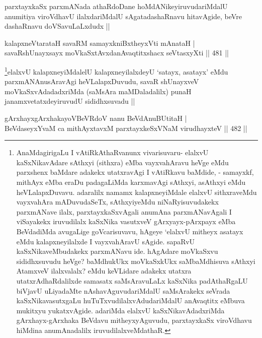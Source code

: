 \begin{artha}
parxtayxkaSx parxmANada athaRdoDane hoMdANikeyiruvudariMdalU anumitiya viroVdhavU ilalxdariMdalU sAgatadashaRnavu hitavAgide, beVre dashaRnavu doVSavuLaLxdudx ||
\end{artha}


\begin{shl}
kalapxneVtarataH savaRM samayxkniBxtheyxVti mAnataH | \\
savaRshUnayxsayx moVkaSxtAvxdanAvaqtitxshacx seVtasxyXti \hfill||  481 ||  
\end{shl}

\begin{artha}
\footnote{AnaMdagirigaLu I vAtiRkAthaRvanunx vivarisuvaru- elalxvU kaSxNikavAdare sAthxyi (sithxra) eMba vayxvahAravu heVge eMdu parxshenx baMdare adakekx utatxravAgi I vAtiRkavu baMdide, - samayxkf, mithAyx eMba eraDu padagaLiMda karxmavAgi sAthxyi, asAthxyi eMdu heVLalapxDuvavu. adaralilx namamx kalapxneyiMdale elalxvU sithxraveMdu vayxvahAra mADuvudaSeTx, sAthxyiyeMdu niNaRyisuvudakekx parxmANave ilalx, parxtayxkaSxvAgali anumAna parxmANavAgali I viSayakekx iruvudilalx kaSxNika vasutxveV gArxyayx-pArxpayx eMba BeVdadiMda avugaLige goVcarisuvavu, hAgeye `elalxvU mitheyx asatayx eMdu kalapxneyilalxde I vayxvahAravU sAgide. sapaRvU kaSxNikaveMbudakekx parxmANavu ide. hAgAdare moVkaSxvu sididhxsuvudu heVge? baMdhukUkx moVkaSxkUkx saMbaMdhisuva sAthxyi AtamxveV ilalxvalalx? eMdu keVLidare adakekx utatxra utatxrAdhaRdalilxde samasatx saMsAravuLaLx kaSxNika padAthaRgaLU biVjavU uLiyadaMte nAshavAguvudariMdalU saMsArakekx seVrada kaSxNikavasutxgaLu huTuTxvudilalxvAdudariMdalU anAvaqtitx eMbuva mukitxyu yukatxvAgide. adariMda elalxvU kaSxNikavAdadxriMda gArxhayx-gArxhaka BeVdavu mitheyxyAguvudu, parxtayxkaSx viroVdhavu hiMdina anumAnadalilx iruvudilalxveMdathaR.}elalxvU kalapxneyiMdalelU kalapxneyilalxdeyU `satayx, asatayx' eMdu parxmANAnusAravAgi heVLalapxDuvudu, savaR shUnayxveV moVkaSxvAdadadxriMda (saMsAra maMDaladalilx) punaH janamxvetatxdeyiruvudU sididhxsuvadu ||
\end{artha}


\begin{shl}
gArxhayxgArxhakayoVBeVRdoV nanu BeVdAnuBUtitaH | \\
BeVdaseyxYvaM ca mithAyxtavxM parxtayxkeSxVNaM virudhayxteV \hfill||  482 ||  
\end{shl}

